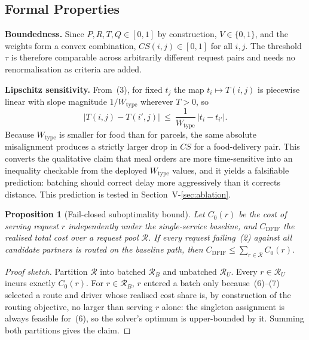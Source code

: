 \documentclass[conference]{IEEEtran}
\newtheorem{proposition}{Proposition}
\begin{document}
\subsection{Formal Properties}
\label{sec:props}

\textbf{Boundedness.} Since $P,R,T,Q\in[0,1]$ by construction, $V\in\{0,1\}$,
and the weights form a convex combination, $CS(i,j)\in[0,1]$ for all $i,j$.
The threshold $\tau$ is therefore comparable across arbitrarily different
request pairs and needs no renormalisation as criteria are added.

\textbf{Lipschitz sensitivity.} From~(3), for fixed $t_j$ the map
$t_i\mapsto T(i,j)$ is piecewise linear with slope magnitude
$1/W_{\text{type}}$ wherever $T>0$, so
\begin{equation}
|T(i,j)-T(i',j)|\ \le\ \frac{1}{W_{\text{type}}}\,|t_i-t_{i'}| .
\end{equation}
Because $W_{\text{type}}$ is smaller for food than for parcels, the same
absolute misalignment produces a strictly larger drop in $CS$ for a
food-delivery pair. This converts the qualitative claim that meal orders are
more time-sensitive into an inequality checkable from the deployed
$W_{\text{type}}$ values, and it yields a falsifiable prediction: batching
should correct delay more aggressively than it corrects distance. This
prediction is tested in Section~V-\ref{sec:ablation}.

\begin{proposition}[Fail-closed suboptimality bound]
\label{prop:fc}
Let $C_0(r)$ be the cost of serving request $r$ independently under the
single-service baseline, and $C_{\mathrm{DFIF}}$ the realised total cost over
a request pool $\mathcal{R}$. If every request failing~(2) against all
candidate partners is routed on the baseline path, then
$C_{\mathrm{DFIF}}\le\sum_{r\in\mathcal{R}}C_0(r)$.
\end{proposition}

\begin{proof}[Proof sketch]
Partition $\mathcal{R}$ into batched $\mathcal{R}_B$ and unbatched
$\mathcal{R}_U$. Every $r\in\mathcal{R}_U$ incurs exactly $C_0(r)$. For
$r\in\mathcal{R}_B$, $r$ entered a batch only because~(6)--(7) selected a
route and driver whose realised cost share is, by construction of the routing
objective, no larger than serving $r$ alone: the singleton assignment is
always feasible for~(6), so the solver's optimum is upper-bounded by it.
Summing both partitions gives the claim.
\end{proof}
\end{document}
